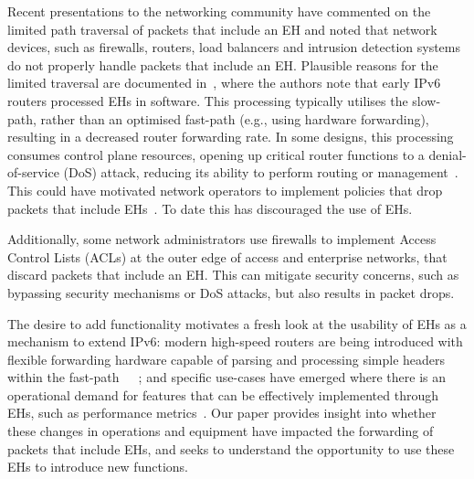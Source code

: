 \documentclass[conference]{IEEEtran}
\begin{document}
Recent presentations to the networking community have commented on the limited
path traversal of packets that include an EH and noted that network devices, such as
firewalls, routers, load balancers and intrusion detection
systems~\cite{nalini-iepg114, fernando-talk} do not properly handle packets
that include an EH. 
Plausible reasons for the limited traversal are documented
in~\cite{ietf-v6ops-hbh-03}, where the authors note that early IPv6 routers
processed EHs in software. This processing typically utilises the slow-path,
rather than an optimised fast-path (e.g., using hardware forwarding), resulting
in a decreased router forwarding rate. In some designs, this processing
consumes control plane resources, opening up critical router functions to a denial-of-service (DoS) attack, reducing its ability to perform routing or management~\cite{naagas2021deh}. This could have motivated network operators to implement policies that
drop packets that include EHs~\cite{rfc9098}.  To date this has discouraged the use
of EHs. 

Additionally, some network administrators use firewalls to implement Access
Control Lists (ACLs) at the outer edge of access and enterprise networks, that
discard packets that include an EH. This can mitigate security concerns, such as
bypassing security mechanisms or DoS
attacks, but also results in packet drops.


The desire to add functionality motivates a fresh look at the usability of EHs
as a mechanism to extend IPv6: modern high-speed routers are being introduced
with flexible forwarding hardware capable of parsing and processing simple
headers within the fast-path~\cite{programmable-data-plane}~\cite{cisco-silicon-one}~\cite{hauser2023}; and specific use-cases have emerged where there is an operational
demand for features that can be effectively implemented through EHs, such as performance metrics~\cite{ietf-ippm-ioam-ipv6-options-12}. Our
paper provides insight into whether these changes in operations and equipment
have impacted the forwarding of packets that include EHs, and seeks to
understand the opportunity to use these EHs to introduce new functions. 
\end{document}

